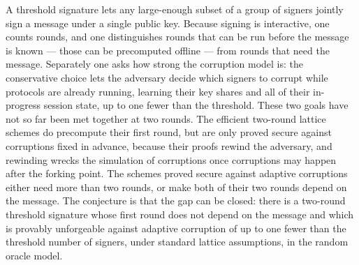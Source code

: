 \documentclass{aicr-conjecture}
\begin{document}

\vspace{0.4em}

\begin{informalconjecture}
A threshold signature lets any large-enough subset of a group of
signers jointly sign a message under a single public key. Because
signing is interactive, one counts rounds, and one distinguishes rounds
that can be run before the message is known --- those can be
precomputed offline --- from rounds that need the message. Separately
one asks how strong the corruption model is: the conservative choice
lets the adversary decide which signers to corrupt while protocols are
already running, learning their key shares and all of their in-progress
session state, up to one fewer than the threshold. These two goals have
not so far been met together at two rounds. The efficient two-round
lattice schemes do precompute their first round, but are only proved
secure against corruptions fixed in advance, because their proofs
rewind the adversary, and rewinding wrecks the simulation of
corruptions once corruptions may happen after the forking point. The
schemes proved secure against adaptive corruptions either need more
than two rounds, or make both of their two rounds depend on the
message. The conjecture is that the gap can be closed: there is a
two-round threshold signature whose first round does not depend on the
message and which is provably unforgeable against adaptive corruption
of up to one fewer than the threshold number of signers, under standard
lattice assumptions, in the random oracle model.
\end{informalconjecture}
\end{document}

